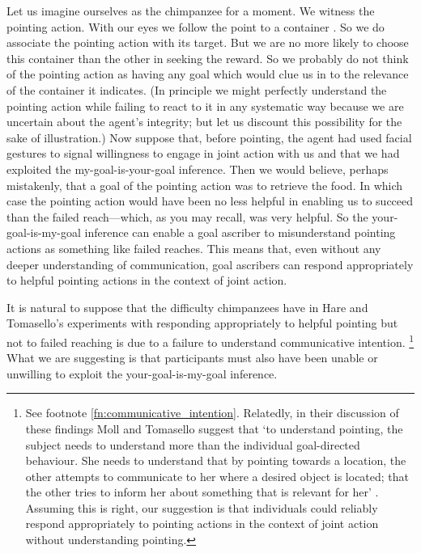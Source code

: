 \documentclass[14pt,a4paper]{extarticle}
\begin{document}
Let us imagine ourselves as the chimpanzee  for a moment.
We witness the pointing action.
With our eyes we follow the point to a container \citep[see][p.\ 6]{Moll:2007gu}.
So we do associate the pointing action with its target.
But we are no more likely to choose this container than the other in seeking the reward.
So we probably do not think of the pointing action as having any goal which would clue us in to the relevance of the container it indicates.
(In principle we might perfectly understand the pointing action while failing to react to it in any systematic way because we are uncertain about the agent's integrity; but let us discount this possibility for the sake of illustration.)
Now suppose 
that, 
before pointing, the agent had used facial gestures to signal willingness to engage in joint action with us
and 
that we had exploited the my-goal-is-your-goal inference.
Then we would believe,
perhaps mistakenly,
that a goal of the pointing action was to retrieve the food.
In which case the pointing action would have been no less helpful in enabling us to succeed than the failed reach---which, as you may recall, was very helpful.
So the your-goal-is-my-goal inference can 
enable a goal ascriber
to  
misunderstand pointing actions as something like  failed reaches.
This means that,
even without any deeper understanding of communication,
goal ascribers can respond appropriately to helpful pointing actions in the context of joint action.


It is natural to suppose that the difficulty chimpanzees have in Hare and Tomasello's experiments with responding appropriately to helpful pointing but not to failed reaching
is due to a failure to understand communicative intention.%
\footnote{
See  footnote \vref{fn:communicative_intention}.
Relatedly,
in their discussion of these findings
Moll and Tomasello suggest that
`to understand pointing, the subject needs to understand more than the individual goal-directed behaviour. 
She needs to understand that by pointing towards a location, the other attempts to communicate to her where a desired object is located; that the other tries to inform her about something that is relevant for her'
\citep[p.\ 6]{Moll:2007gu}.
Assuming this is right, our suggestion is that individuals could reliably  respond  appropriately to pointing actions in the context of joint action without understanding pointing.
}
What we are suggesting is that participants must also have been unable or unwilling to 
exploit the your-goal-is-my-goal inference.
\end{document}
